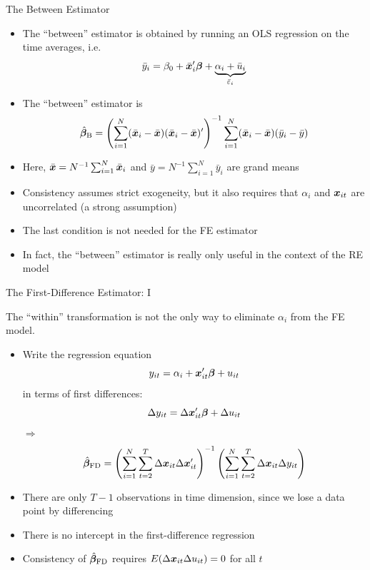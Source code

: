 \documentclass[english, professionalfonts,smaller,xcolor=dvipsnames]{beamer}
\begin{document}
\begin{frame}{The Between Estimator}
\begin{itemize}
\item The ``between'' estimator is obtained by running an OLS regression on the time averages, i.e.
$$
\bar{y}_i = \beta_{0} + \bar{\bm x}_i' \bm \beta + \underbrace{\alpha_i + \bar{u}_i}_{\bar\varepsilon_i}
$$
\vspace*{-\baselineskip}
\item[$\Rightarrow$] The ``between'' estimator is
$$
\hat{\bm \beta}_{\text{B}} = \left(\sum_{i=1}^N (\bar{\bm x}_i - \bar{\bm x} ) (\bar{\bm x}_i - \bar{\bm x} )' \right)^{-1} \sum_{i=1}^N (\bar{\bm x}_i - \bar{\bm x} )(\bar{y}_i - \bar{y} )
$$
\item Here, $\bar{\bm x}=N^{-1}\sum_{i=1}^N\bar{\bm x}_i$ and $\bar{y}=N^{-1}\sum_{i=1}^N\bar{y}_i$ are grand means
\item Consistency assumes strict exogeneity, but it also requires that $\alpha_i$ and $\bm x_{it}$ are uncorrelated (a strong assumption)
\item The last condition is not needed for the FE estimator
\item In fact, the ``between'' estimator is really only useful in the context of the RE model
\end{itemize}
\end{frame}

\begin{frame}{The First-Difference Estimator: I}

The ``within'' transformation is not the only way to eliminate $\alpha_i$ from the FE model.

\begin{itemize}
\item Write the regression equation
\[y_{it} = \alpha_i + \bm x_{it}' \bm \beta + u_{it}
\]
in terms of first differences:
$$
\Delta y_{it} = \Delta \bm x_{it}' \bm \beta + \Delta u_{it}
$$
$\Rightarrow$
\[
\hat{\bm \beta}_{\text{FD}}
=
\left(
\sum_{i=1}^{N}\sum_{t=2}^{T}
\Delta \bm x_{it}\Delta \bm x_{it}'
\right)^{-1}
\left(
\sum_{i=1}^{N}\sum_{t=2}^{T}
\Delta \bm x_{it}\Delta y_{it}
\right)
\]

\item There are only $T-1$ observations in time dimension, since we lose a data point by differencing

\item There is no intercept in the first-difference regression

\item Consistency of $\hat{\bm \beta}_{\text{FD}}$ requires $
E(\Delta \bm x_{it} \Delta u_{it}) = 0$ for all $t$


\end{itemize}

\end{frame}
\end{document}
